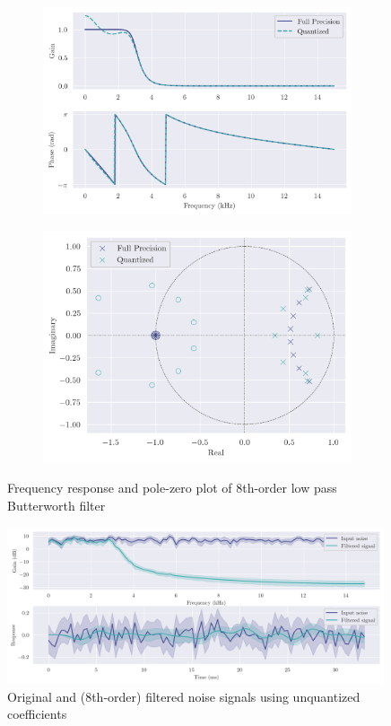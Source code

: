 \begin{figure}[ht]
    \centering
    \begin{subfigure}[b]{0.52\textwidth}
        \centering
        \includegraphics[width=\textwidth]{images/q8_8th_freqz.png}
    \end{subfigure}
    \hfill
    \begin{subfigure}[b]{0.47\textwidth}
        \centering
        \includegraphics[width=\textwidth]{images/q8_8th_zp.png}
    \end{subfigure}
    \caption{Frequency response and pole-zero plot of 8th-order low pass Butterworth filter}
\end{figure}

\begin{figure}[!ht]
    \centering
    \includegraphics[width=0.99\textwidth]{images/q8_8th_stability.png}
    \caption{Original and (8th-order) filtered noise signals using unquantized coefficients}
\end{figure}

